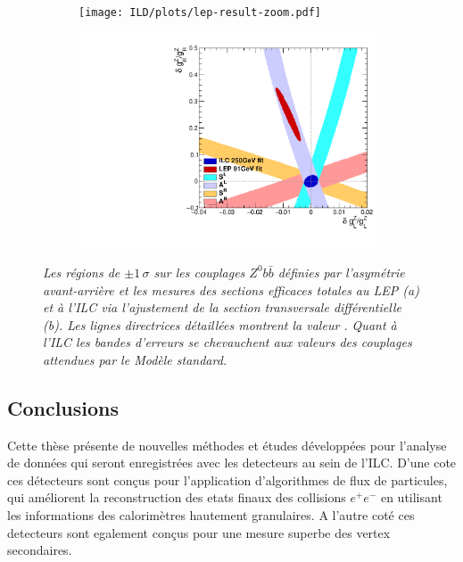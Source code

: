 \begin{figure}
	\centering
	\begin{subfigure}{0.5\textwidth}
		\texttt{[image: ILD/plots/lep-result-zoom.pdf]}
		\caption{\label{fig:LEPILCResult_a_3F} }
	\end{subfigure}%
	\begin{subfigure}{0.5\textwidth}
		\centering
		\includegraphics[width=0.99\textwidth]{ILD/plots/ilc-result.pdf}
		\caption{\label{fig:LEPILCResult_b_3F} }
	\end{subfigure}
	\caption{\sl Les régions de $\pm 1\,\sigma$ sur les couplages $Z^0b\bar{b}$ définies par l'asymétrie avant-arrière et les mesures des sections efficaces totales au LEP (a) et à l'ILC via l'ajustement de la section transversale différentielle (b). Les lignes directrices détaillées montrent la valeur \sm. Quant à l'ILC les bandes d'erreurs se chevauchent aux valeurs des couplages attendues par le Modèle standard.  }
	\label{fig:LEPILCResult_3F}
\end{figure}

\subsection*{Conclusions}

Cette thèse présente de nouvelles méthodes et études développées pour l'analyse de données qui seront enregistrées avec les detecteurs au sein de l'ILC. 
D'une cote ces détecteurs sont conçus pour l'application d'algorithmes de flux de particules, qui améliorent la reconstruction des etats finaux des collisions $e^+e^-$ en utilisant les informations des calorimètres hautement granulaires.
A l'autre coté ces detecteurs sont egalement conçus pour une mesure superbe des vertex secondaires.

